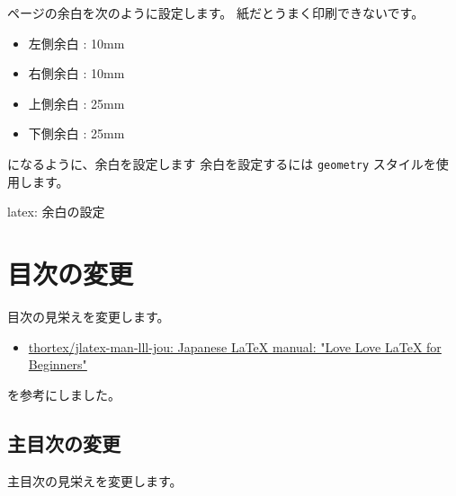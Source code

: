 \documentclass[dvipdfmx,a4j,14pt,uplatex,openany]{jsbook}
\begin{document}
ページの余白を次のように設定します。
紙だとうまく印刷できないです。

\begin{itemize}
\item 左側余白 : 10mm
\item 右側余白 : 10mm
\item 上側余白 : 25mm
\item 下側余白 : 25mm
\end{itemize}

になるように、余白を設定します
余白を設定するには \texttt{geometry} スタイルを使用します。


\begin{programlist}[label={org857b865}]{latex}{: 余白の設定}\usepackage[top=25truemm,bottom=25truemm,inner=10truemm,outer=10truemm]{geometry}
\end{programlist}


\section{目次の変更}
\label{sec:org8d0ad94}
目次の見栄えを変更します。

\begin{itemize}
\item \href{https://github.com/thortex/jlatex-man-lll-jou}{thortex/jlatex-man-lll-jou: Japanese \LaTeX{} manual: "Love Love \LaTeX{} for Beginners"}
\end{itemize}

を参考にしました。

\subsection{主目次の変更}
\label{sec:org1b822fc}
主目次の見栄えを変更します。
\end{document}
